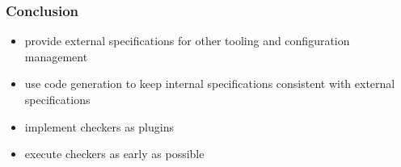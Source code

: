 \begin{frame}
	\frametitle{Conclusion}

	\begin{itemize}[<+-| alert@+>]
	\item provide external specifications for other tooling and configuration management
	\item use code generation to keep internal specifications consistent with external specifications
	\item implement checkers as plugins
	\item execute checkers as early as possible
	\end{itemize}

\end{frame}






\nocite{raab2017introducing}

\appendix

\begin{frame}[allowframebreaks]
	
	
\end{frame}




